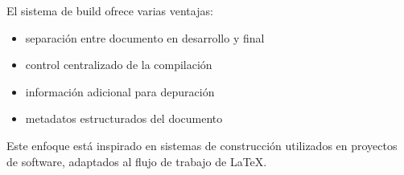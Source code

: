 El sistema de build ofrece varias ventajas:

\begin{itemize}

\item separación entre documento en desarrollo y final
\item control centralizado de la compilación
\item información adicional para depuración
\item metadatos estructurados del documento

\end{itemize}



\begin{examplebox}
Este enfoque está inspirado en sistemas de
construcción utilizados en proyectos de software,
adaptados al flujo de trabajo de \LaTeX.
\end{examplebox}

